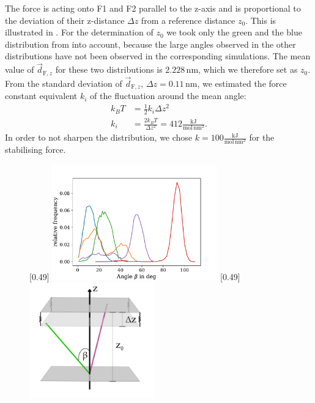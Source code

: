 The force is acting onto F1 and F2 parallel to the z-axis and is proportional to the deviation of their z-distance $\Delta z$ from a reference distance $z_0$. This is illustrated in . For the determination of $z_0$ we took only the green and the blue distribution from  into account, because the large angles observed in the other distributions have not been observed in the corresponding \charmm{} simulations. The mean value of $\vec{d}_{\text{F}, z}$ for these two distributions is $2.228\,\si{\nano\metre}$, which we therefore set as $z_0$. From the standard deviation of $\vec{d}_{\text{F}, z}$, $\Delta z = 0.11\,\si{\nano\metre}$, we estimated the force constant equivalent $k_i$ of the fluctuation around the mean angle:
\begin{align}
k_B T &= \frac{1}{2} k_i \Delta z^2\\
k_i &= \frac{2 k_B T}{\Delta z^2} = 412 \frac{\si{\kilo\joule}}{\si{\mole}\,\si{\nano\metre}^2}.
\end{align}
In order to not sharpen the distribution, we chose $k = 100 \frac{\si{\kilo\joule}}{\si{\mole}\,\si{\nano\metre}^2}$ for the stabilising force.
%
%
%
\begin{figure}[htb]
	\subcaptionbox{\label{stabil:sarascurves}}[0.49\textwidth]{
		\includegraphics[height=5cm]{figures/introduction/sara_angles}
	}\hfill%
	\subcaptionbox{\label{stabil:forceillustr}}[0.49\textwidth]{
		\includegraphics[height=5cm]{figures/introduction/forceapproach}
	}%
\end{figure}
%
%
%
